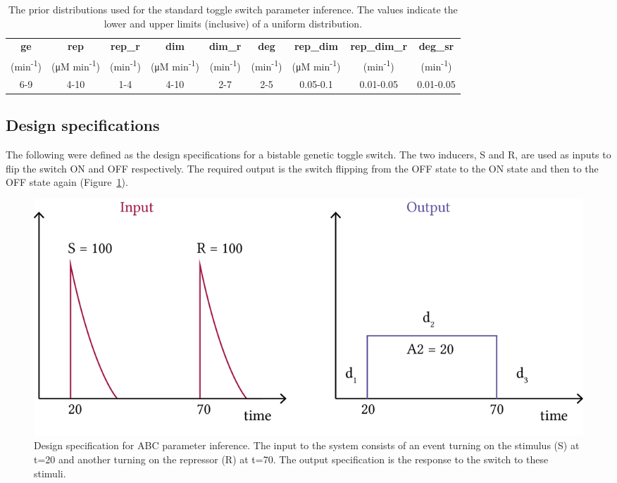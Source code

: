 \begin{table}[t]
\centering
\caption{The prior distributions used for the standard toggle switch parameter inference. The values indicate the lower and upper limits (inclusive) of a uniform distribution.}
\label{tab:param_inf_params}
\centerfloat
\begin{tabular}{ccccccccc}
\toprule
 \textbf{ge}     & \textbf{rep}     & \textbf{rep\_r}     & \textbf{dim}    & \textbf{dim\_r}     & \textbf{deg}  & \textbf{rep\_dim}    & \textbf{rep\_dim\_r} & \textbf{deg\_sr}    \\
 (min\textsuperscript{-1})&(μM min\textsuperscript{-1})&(min\textsuperscript{-1})&(μM min\textsuperscript{-1})&(min\textsuperscript{-1})&(min\textsuperscript{-1})&(μM min\textsuperscript{-1})&(min\textsuperscript{-1})&(min\textsuperscript{-1})\\
6-9     & 4-10    & 1-4       & 4-10   & 2-7       & 2-5  & 0.05-0.1   & 0.01-0.05     & 0.01-0.05        \\ \bottomrule
\end{tabular}
\end{table}

\subsection{Design specifications}

The following were defined as the design specifications for a bistable genetic toggle switch. The two inducers, S and R, are used as inputs to flip the switch ON and OFF respectively. The required output is the switch flipping from the OFF state to the ON state and then to the OFF state again (Figure~\ref{fig:abc_behav}). 


\begin{figure}[htbp]
	\begin{center}
\includegraphics[scale=0.7]{../../chapters/chapterABCSysBio/images/behaviour.png}
\caption[Design specification for ABC parameter inference]{\label{fig:abc_behav}Design specification for ABC parameter inference. The input to the system consists of an event turning on the stimulus (S) at t=20 and another turning on the repressor (R) at t=70. The output specification is the response to the switch to these stimuli.}
\end{center}
\end{figure}

